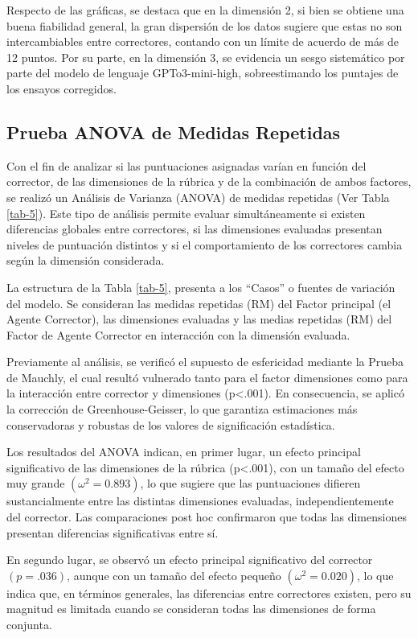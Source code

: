 \documentclass[spanish]{textolivre}
\begin{document}
Respecto de las gráficas, se destaca que en la dimensión 2, si bien se obtiene una buena fiabilidad general, la gran dispersión de los datos sugiere que estas no son intercambiables entre correctores, contando con un límite de acuerdo de más de 12 puntos. Por su parte, en la dimensión 3, se evidencia un sesgo sistemático por parte del modelo de lenguaje GPTo3-mini-high, sobreestimando los puntajes de los ensayos corregidos.

\subsection{Prueba ANOVA de Medidas Repetidas}
Con el fin de analizar si las puntuaciones asignadas varían en función del corrector, de las dimensiones de la rúbrica y de la combinación de ambos factores, se realizó un Análisis de Varianza (ANOVA) de medidas repetidas (Ver Tabla \ref{tab-5}). Este tipo de análisis permite evaluar simultáneamente si existen diferencias globales entre correctores, si las dimensiones evaluadas presentan niveles de puntuación distintos y si el comportamiento de los correctores cambia según la dimensión considerada.

La estructura de la Tabla \ref{tab-5}, presenta a los ``Casos'' o fuentes de variación del modelo. Se consideran las medidas repetidas (RM) del Factor principal (el Agente Corrector), las dimensiones evaluadas y las  medias repetidas (RM) del Factor de Agente Corrector en interacción con la dimensión evaluada.

Previamente al análisis, se verificó el supuesto de esfericidad mediante la Prueba de Mauchly, el cual resultó vulnerado tanto para el factor dimensiones como para la interacción entre corrector y dimensiones (p<.001). En consecuencia, se aplicó la corrección de Greenhouse-Geisser, lo que garantiza estimaciones más conservadoras y robustas de los valores de significación estadística.

Los resultados del ANOVA indican, en primer lugar, un efecto principal significativo de las dimensiones de la rúbrica (p<.001), con un tamaño del efecto muy grande $(\omega^2 = 0.893)$, lo que sugiere que las puntuaciones difieren sustancialmente entre las distintas dimensiones evaluadas, independientemente del corrector. Las comparaciones post hoc confirmaron que todas las dimensiones presentan diferencias significativas entre sí.

En segundo lugar, se observó un efecto principal significativo del corrector $(p=.036)$, aunque con un tamaño del efecto pequeño $(\omega^2 = 0.020)$, lo que indica que, en términos generales, las diferencias entre correctores existen, pero su magnitud es limitada cuando se consideran todas las dimensiones de forma conjunta.
\end{document}
